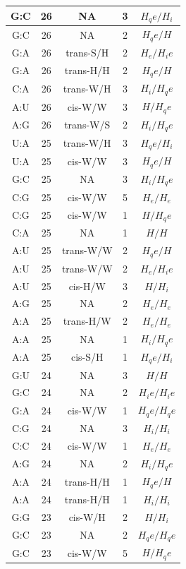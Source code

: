 \begin{center}
\begin{longtable}{c|c|c|c|c}
G:C & 26 & NA & 3 & $H_qe/H_i$ \\  \hline
G:C & 26 & NA & 2 & $H_qe/H$ \\  \hline
G:A & 26 & trans-S/H & 2 & $H_e/H_ie$ \\  \hline
G:A & 26 & trans-H/H & 2 & $H_qe/H$ \\  \hline
C:A & 26 & trans-W/H & 3 & $H_i/H_qe$ \\  \hline
A:U & 26 & cis-W/W & 3 & $H/H_qe$ \\  \hline
A:G & 26 & trans-W/S & 2 & $H_i/H_qe$ \\  \hline
U:A & 25 & trans-W/H & 3 & $H_qe/H_i$ \\  \hline
U:A & 25 & cis-W/W & 3 & $H_qe/H$ \\  \hline
G:C & 25 & NA & 3 & $H_i/H_qe$ \\  \hline
C:G & 25 & cis-W/W & 5 & $H_e/H_e$ \\  \hline
C:G & 25 & cis-W/W & 1 & $H/H_qe$ \\  \hline
C:A & 25 & NA & 1 & $H/H$ \\  \hline
A:U & 25 & trans-W/W & 2 & $H_qe/H$ \\  \hline
A:U & 25 & trans-W/W & 2 & $H_e/H_ie$ \\  \hline
A:U & 25 & cis-H/W & 3 & $H/H_i$ \\  \hline
A:G & 25 & NA & 2 & $H_e/H_e$ \\  \hline
A:A & 25 & trans-H/W & 2 & $H_e/H_e$ \\  \hline
A:A & 25 & NA & 1 & $H_i/H_qe$ \\  \hline
A:A & 25 & cis-S/H & 1 & $H_qe/H_i$ \\  \hline
G:U & 24 & NA & 3 & $H/H$ \\  \hline
G:C & 24 & NA & 2 & $H_ie/H_ie$ \\  \hline
G:A & 24 & cis-W/W & 1 & $H_qe/H_qe$ \\  \hline
C:G & 24 & NA & 3 & $H_i/H_i$ \\  \hline
C:C & 24 & cis-W/W & 1 & $H_e/H_e$ \\  \hline
A:G & 24 & NA & 2 & $H_i/H_qe$ \\  \hline
A:A & 24 & trans-H/H & 1 & $H_qe/H$ \\  \hline
A:A & 24 & trans-H/H & 1 & $H_i/H_i$ \\  \hline
G:G & 23 & cis-W/H & 2 & $H/H_i$ \\  \hline
G:C & 23 & NA & 2 & $H_qe/H_qe$ \\  \hline
G:C & 23 & cis-W/W & 5 & $H/H_qe$ \\  \hline

\end{longtable}
\end{center}
